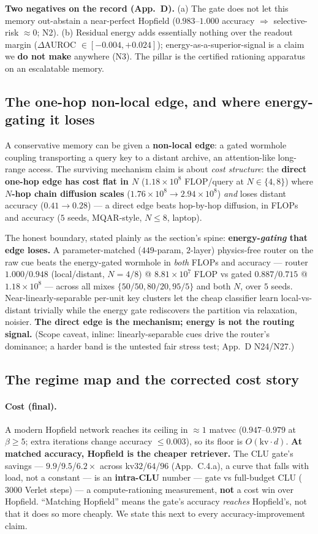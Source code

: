 \documentclass[11pt]{article}
\begin{document}
\textbf{Two negatives on the record (App.~D).} (a) The gate does not let this memory out-abstain a near-perfect Hopfield ($0.983$--$1.000$ accuracy $\Rightarrow$ selective-risk $\approx0$; N2). (b) Residual energy adds essentially nothing over the readout margin ($\Delta$AUROC $\in[-0.004,+0.024]$); energy-as-a-superior-signal is a claim we \textbf{do not make} anywhere (N3). The pillar is the certified rationing apparatus on an escalatable memory.

\subsection{The one-hop non-local edge, and where energy-gating it loses}
A conservative memory can be given a \textbf{non-local edge}: a gated wormhole coupling transporting a query key to a distant archive, an attention-like long-range access. The surviving mechanism claim is about \emph{cost structure}: the \textbf{direct one-hop edge has cost flat in $N$} ($1.18{\times}10^8$ FLOP/query at $N\in\{4,8\}$) where \textbf{$N$-hop chain diffusion scales} ($1.76{\times}10^8\to2.94{\times}10^8$) \emph{and} loses distant accuracy ($0.41\to0.28$) --- a direct edge beats hop-by-hop diffusion, in FLOPs and accuracy ($5$ seeds, MQAR-style, $N\le8$, laptop).

The honest boundary, stated plainly as the section's spine: \textbf{energy-\emph{gating} that edge loses.} A parameter-matched ($449$-param, $2$-layer) physics-free router on the raw cue beats the energy-gated wormhole in \emph{both} FLOPs and accuracy --- router $1.000/0.948$ (local/distant, $N=4/8$) @ $8.81{\times}10^7$ FLOP vs gated $0.887/0.715$ @ $1.18{\times}10^8$ --- across all mixes $\{50/50,80/20,95/5\}$ and both $N$, over $5$ seeds. Near-linearly-separable per-unit key clusters let the cheap classifier learn local-vs-distant trivially while the energy gate rediscovers the partition via relaxation, noisier. \textbf{The direct edge is the mechanism; energy is not the routing signal.} (Scope caveat, inline: linearly-separable cues drive the router's dominance; a harder band is the untested fair stress test; App.~D N24/N27.)

\subsection{The regime map and the corrected cost story}
\paragraph{Cost (final).} A modern Hopfield network reaches its ceiling in $\approx1$ matvec ($0.947$--$0.979$ at $\beta\ge5$; extra iterations change accuracy $\le0.003$), so its floor is $O(\text{kv}\cdot d)$. \textbf{At matched accuracy, Hopfield is the cheaper retriever.} The CLU gate's savings --- $9.9$/$9.5$/$6.2\times$ across kv$32$/$64$/$96$ (App.~C.4.a), a curve that falls with load, not a constant --- is an \textbf{intra-CLU} number --- gate vs full-budget CLU ($3000$ Verlet steps) --- a compute-rationing measurement, \textbf{not} a cost win over Hopfield. ``Matching Hopfield'' means the gate's accuracy \emph{reaches} Hopfield's, not that it does so more cheaply. We state this next to every accuracy-improvement claim.
\end{document}
